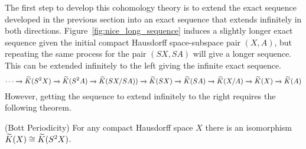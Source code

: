 \documentclass[../sean_thesis.tex]{subfiles}
\begin{document}
The first step to develop this cohomology theory is to extend the exact sequence developed in the previous section into an exact sequence that extends infinitely in both directions. Figure~\ref{fig:nice_long_sequence} induces a slightly longer exact sequence given the initial compact Hausdorff space-subspace pair $(X,A)$, but repeating the same process for the pair $(SX, SA)$ will give a longer sequence. This can be extended infinitely to the left giving the infinite exact sequence. 
\begin{equation*}
	\cdots \xrightarrow{}
	\widetilde{K}(S^2X) \xrightarrow{}
	\widetilde{K}(S^2A) \xrightarrow{}
	\widetilde{K}(SX/SA)) \xrightarrow{}
	\widetilde{K}(SX) \xrightarrow{}
	\widetilde{K}(SA) \xrightarrow{}
	\widetilde{K}(X/A) \xrightarrow{}
	\widetilde{K}(X) \xrightarrow{}
	\widetilde{K}(A)
\end{equation*}
However, getting the sequence to extend infinitely to the right requires the following theorem. 

\begin{theorem} (Bott Periodicity)
	For any compact Hausdorff space $X$ there is an isomorphism $\widetilde{K}(X) \cong \widetilde{K}(S^2X)$.
\end{theorem}

\end{document}
